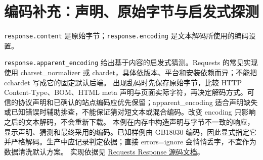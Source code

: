 \section{编码补充：声明、原始字节与启发式探测}\label{rev:crawler:encoding}
\texttt{response.content} 是原始字节；\texttt{response.encoding} 是文本解码所使用的编码设置。

\texttt{response.apparent\_encoding} 给出基于内容的启发式猜测。Requests 的常见实现使用 charset\_normalizer 或 chardet，具体依版本、平台和安装依赖而异；不能把 cchardet 写成它的固定默认后端。
出现乱码时先保存原始字节，比较 HTTP Content-Type、BOM、HTML meta 声明与页面实际字符，再决定解码方式。可信的协议声明和已确认的站点编码应优先保留；apparent\_encoding 适合声明缺失或已知错误时辅助排查，不能保证猜对短文本或混合编码。改变 encoding 只影响之后的文本解码，不会重新下载。
本例在内存中构造声明与字节不一致的响应，显示声明、猜测和最终采用的编码。已知样例由 GB18030 编码，因此显式指定它并严格解码。生产中应记录判定依据；直接 errors=ignore 会悄悄丢字，不宜作为数据清洗默认方案。
实现依据见 \href{https://requests.readthedocs.io/en/latest/_modules/requests/models/}{Requests Response 源码文档}。
